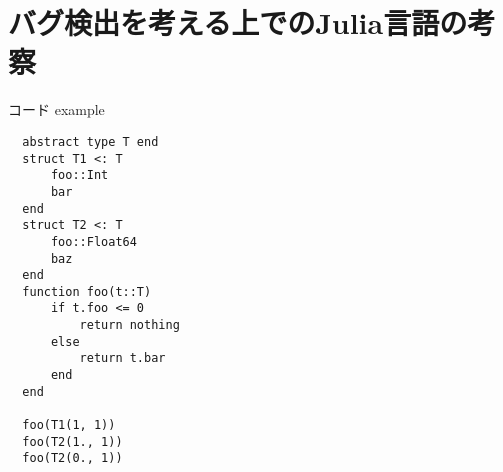 
\section{バグ検出を考える上でのJulia言語の考察}

コード example

\begin{verbatim}
  abstract type T end
  struct T1 <: T
      foo::Int
      bar
  end
  struct T2 <: T
      foo::Float64
      baz
  end
  function foo(t::T)
      if t.foo <= 0
          return nothing
      else
          return t.bar
      end
  end

  foo(T1(1, 1))
  foo(T2(1., 1))
  foo(T2(0., 1))
\end{verbatim}
